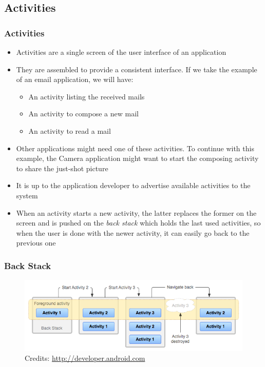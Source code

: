 \subsection{Activities}
\begin{frame}
  \frametitle{Activities}
  \fontsize{11}{10}\selectfont
  \begin{itemize}
  \item Activities are a single screen of the user interface of an
    application
  \item They are assembled to provide a consistent interface. If we
    take the example of an email application, we will have:
    \begin{itemize}
    \item An activity listing the received mails
    \item An activity to compose a new mail
    \item An activity to read a mail
    \end{itemize}
  \item Other applications might need one of these activities. To
    continue with this example, the Camera application might want to
    start the composing activity to share the just-shot picture
  \item It is up to the application developer to advertise available
    activities to the system
  \item When an activity starts a new activity, the latter replaces
    the former on the screen and is pushed on the \emph{back stack}
    which holds the last used activities, so when the user is done
    with the newer activity, it can easily go back to the previous one
  \end{itemize}
\end{frame}

\begin{frame}
  \frametitle{Back Stack}
  \begin{figure}[h!]
    \centering
    \includegraphics[width=\textwidth]{slides/android-application-activities/activity-backstack.png}\\
    {
      \tiny
      Credits: \url{http://developer.android.com}
    }
  \end{figure}
\end{frame}

